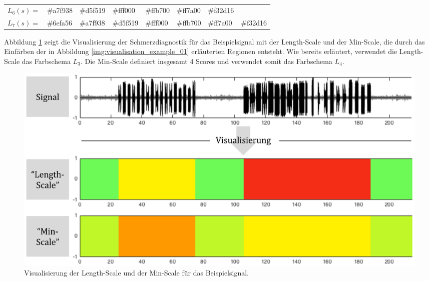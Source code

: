 \begin{table}[h]
\begin{tabular}{@{}clllllll@{}}
\multicolumn{1}{l|}{$L_6(s) = $} & \multicolumn{1}{l|}{\cellcolor[HTML]{A7F938}\#a7f938} & \multicolumn{1}{l|}{\cellcolor[HTML]{D5F519}\#d5f519} & \multicolumn{1}{l|}{\cellcolor[HTML]{FFF000}\#fff000} & \multicolumn{1}{l|}{\cellcolor[HTML]{FFB700}\#ffb700} & \multicolumn{1}{l|}{\cellcolor[HTML]{FF7A00}\#ff7a00} & \multicolumn{1}{l|}{\cellcolor[HTML]{F32D16}\#f32d16} &                                                       \\ \cmidrule(l){2-8} 
\multicolumn{1}{l|}{$L_7(s) = $} & \multicolumn{1}{l|}{\cellcolor[HTML]{6EFA56}\#6efa56} & \multicolumn{1}{l|}{\cellcolor[HTML]{A7F938}\#a7f938} & \multicolumn{1}{l|}{\cellcolor[HTML]{D5F519}\#d5f519} & \multicolumn{1}{l|}{\cellcolor[HTML]{FFF000}\#fff000} & \multicolumn{1}{l|}{\cellcolor[HTML]{FFB700}\#ffb700} & \multicolumn{1}{l|}{\cellcolor[HTML]{FF7A00}\#ff7a00} & \multicolumn{1}{l|}{\cellcolor[HTML]{F32D16}\#f32d16} \\ \bottomrule
\end{tabular}
\end{table}

Abbildung \ref{fig:viz_without_t_01} zeigt die Visualisierung der Schmerzdiagnostik für das Beispielsignal mit der \glqq Length-Scale\grqq{} und der \glqq Min-Scale\grqq{}, die durch das Einfärben der in Abbildung \ref{img:visualisation_example_01} erläuterten Regionen entsteht. Wie bereits erläutert, verwendet die \glqq Length-Scale\grqq{} das Farbschema $L_3$. Die \glqq Min-Scale\grqq{} definiert insgesamt 4 Scores und verwendet somit das Farbschema $L_4$.

\begin{figure}[h]
	\centering
	\includegraphics[width=1\textwidth]{bilder/viz_without_t_02.png}
	\caption{Visualisierung der \glqq Length-Scale\grqq{} und der \glqq Min-Scale\grqq{} für das Beispielsignal. }
	\label{fig:viz_without_t_01}
\end{figure}

